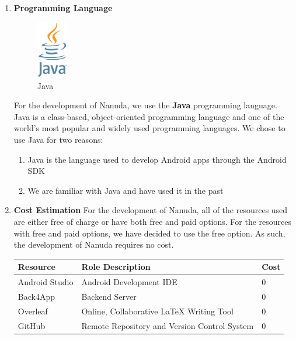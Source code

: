 \documentclass[conference]{IEEEtran}
\begin{document}
\begin{enumerate}
    \item \textbf{Programming Language}
        \newline
        \begin{figure}[htbp]
            \centerline{\includegraphics[height=25mm,scale=0.5]{img/logo-java.png}}
            \caption{Java}
            \label{fig:java-logo}
        \end{figure}
        \newline
        For the development of Nanuda, we use the \textbf{Java} programming language. Java is a class-based, object-oriented programming language and one of the world's most popular and widely used programming languages. We chose to use Java for two reasons:
        \begin{enumerate}
            \item Java is the language used to develop Android apps through the Android SDK
            \item We are familiar with Java and have used it in the past
        \end{enumerate}
    \item \textbf{Cost Estimation}
        \newline
        For the development of Nanuda, all of the resources used are either free of charge or have both free and paid options. For the resources with free and paid options, we have decided to use the free option. As such, the development of Nanuda requires no cost.
        \begin{center}
            \begin{tabular}{|p{6em}|p{10em}|p{4em}|}
                \hline
                \textbf{Resource} & \textbf{Role Description} & \textbf{Cost} \\
                \hline
                Android Studio & Android Development IDE & 0 \\
                \hline
                Back4App & Backend Server & 0 \\
                \hline
                Overleaf & Online, Collaborative LaTeX Writing Tool & 0 \\
                \hline
                GitHub & Remote Repository and Version Control System & 0 \\

\end{tabular}
\end{center}
\end{enumerate}
\end{document}
